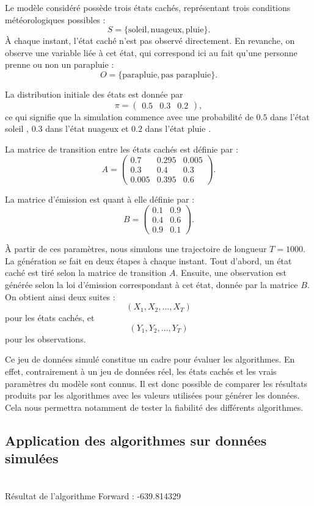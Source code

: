 \documentclass[11pt]{article}
\begin{document}
Le modèle considéré possède trois états cachés, représentant trois conditions météorologiques possibles :
\[
S = \{\text{soleil}, \text{nuageux}, \text{pluie}\}.
\]
À chaque instant, l'état caché n'est pas observé directement. En revanche, on observe une variable liée à cet état, qui correspond ici au fait qu'une personne prenne ou non un parapluie :
\[
O = \{\text{parapluie}, \text{pas parapluie}\}.
\]

La distribution initiale des états est donnée par
\[
\pi =
\begin{pmatrix}
0.5 & 0.3 & 0.2
\end{pmatrix},
\]
ce qui signifie que la simulation commence avec une probabilité de $0.5$ dans l'état \og soleil \fg, $0.3$ dans l'état \og nuageux \fg{} et $0.2$ dans l'état \og pluie \fg.

La matrice de transition entre les états cachés est définie par : 
\[
A =
\begin{pmatrix}
0.7 & 0.295 & 0.005 \\
0.3 & 0.4 & 0.3 \\
0.005 & 0.395 & 0.6
\end{pmatrix}.
\]

La matrice d'émission est quant à elle définie par :
\[
B =
\begin{pmatrix}
0.1 & 0.9 \\
0.4 & 0.6 \\
0.9 & 0.1
\end{pmatrix}.
\]

À partir de ces paramètres, nous simulons une trajectoire de longueur $T = 1000$. La génération se fait en deux étapes à chaque instant. Tout d'abord, un état caché est tiré selon la matrice de transition $A$. Ensuite, une observation est générée selon la loi d'émission correspondant à cet état, donnée par la matrice $B$. On obtient ainsi deux suites :
\[
(X_1, X_2, \ldots, X_T)
\]
pour les états cachés, et
\[
(Y_1, Y_2, \ldots, Y_T)
\]
pour les observations.

Ce jeu de données simulé constitue un cadre pour évaluer les algorithmes. En effet, contrairement à un jeu de données réel, les états cachés et les vrais paramètres du modèle sont connus. Il est donc possible de comparer les résultats produits par les algorithmes avec les valeurs utilisées pour générer les données.
Cela nous permettra notamment de tester la fiabilité des différents algorithmes.

\subsection{Application des algorithmes sur données simulées}\mbox{}\\
Résultat de l'algorithme Forward : 
-639.814329
\end{document}
